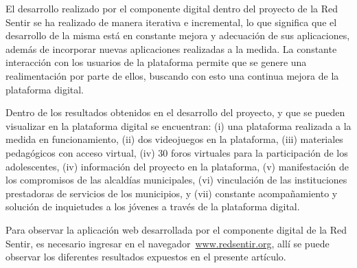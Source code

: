 \documentclass[a4paper]{article}
\begin{document}
El desarrollo realizado por el componente digital dentro del proyecto de la Red Sentir se ha realizado de manera iterativa e incremental, lo que significa que el desarrollo de la misma está en constante mejora y adecuación de sus aplicaciones, además de incorporar nuevas aplicaciones realizadas a la medida. La constante interacción con los usuarios de la plataforma permite que se genere una realimentación por parte de ellos, buscando con esto una continua mejora de la plataforma digital.

Dentro de los resultados obtenidos en el desarrollo del proyecto, y que se pueden visualizar en la plataforma digital se encuentran: (i) una plataforma realizada a la medida en funcionamiento, (ii) dos videojuegos en la plataforma, (iii) materiales pedagógicos con acceso virtual, (iv) $30$ foros virtuales para la participación de los adolescentes, (iv) información del proyecto en la plataforma, (v) manifestación de los compromisos de las alcaldías municipales, (vi) vinculación de las instituciones prestadoras de servicios de los municipios, y (vii) constante acompañamiento y solución de inquietudes a los jóvenes a través de la plataforma digital.

Para observar la aplicación web desarrollada por el componente digital de la Red Sentir, es necesario ingresar en el navegador~\url{www.redsentir.org}, allí se puede observar los diferentes resultados expuestos en el presente artículo.
\end{document}
